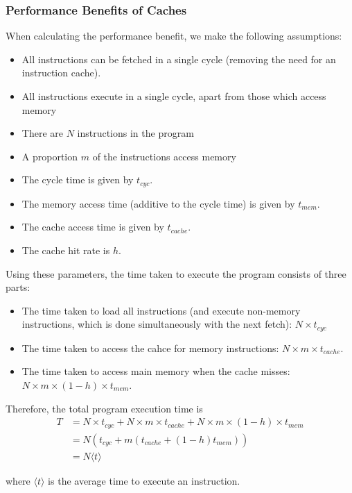 \documentclass{article}
\begin{document}
	\subsubsection{Performance Benefits of Caches}
	When calculating the performance benefit, we make the following assumptions:
	\begin{itemize}
		\item All instructions can be fetched in a single cycle (removing the need for an instruction cache).
		\item All instructions execute in a single cycle, apart from those which access memory
		\item There are $N$ instructions in the program
		\item A proportion $m$ of the instructions access memory
		\item The cycle time is given by $t_{cyc}$.
		\item The memory access time (additive to the cycle time) is given by $t_{mem}$.
		\item The cache access time is given by $t_{cache}$.
		\item The cache hit rate is $h$.
	\end{itemize}
	
	Using these parameters, the time taken to execute the program consists of three parts:
	
	\begin{itemize}
		\item The time taken to load all instructions (and execute non-memory instructions, which is done simultaneously with the next fetch): $N \times t_{cyc}$
		\item The time taken to access the cahce for memory instructions: $N \times m \times t_{cache}$.
		\item The time taken to access main memory when the cache misses: $N \times m \times (1 - h) \times t_{mem}$.	
	\end{itemize}
	
	Therefore, the total program execution time is 
	\begin{align*}
	T &= N \times t_{cyc} + N \times m \times t_{cache} + N \times m \times (1 - h) \times t_{mem}\\
	  &= N (t_{cyc} + m(t_{cache} + (1 - h)t_{mem}))\\ 
	  &= N \langle t\rangle
	\end{align*}
	
	where $\langle t \rangle$ is the average time to execute an instruction.
	
\end{document}
